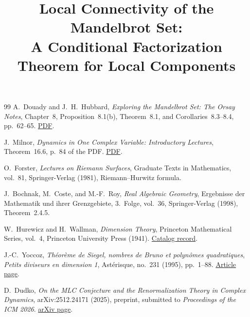 \documentclass[11pt,a4paper]{report}
\title{Local Connectivity of the Mandelbrot Set:\\
A Conditional Factorization Theorem for Local Components}
\author{}
\date{}
\begin{document}
\maketitle
\tableofcontents
\clearpage








\renewcommand{\bibname}{References}
\begin{thebibliography}{99}\small
{}
A.~Douady and J.~H.~Hubbard,
\foreignlanguage{english}{\emph{Exploring the Mandelbrot Set: The Orsay Notes}},
Chapter~8, Proposition~8.1(b), Theorem~8.1, and Corollaries~8.3--8.4,
pp.~62--65.
\href{https://pi.math.cornell.edu/~hubbard/OrsayEnglish.pdf}
{PDF}.

J.~Milnor,
\foreignlanguage{english}{\emph{Dynamics in One Complex Variable: Introductory Lectures}},
Theorem~16.6, p.~84 of the PDF.
\href{https://arxiv.org/pdf/math/9201272#page=84}
{PDF}.

O.~Forster,
\foreignlanguage{english}{\emph{Lectures on Riemann Surfaces}},
Graduate Texts in Mathematics, vol.~81, Springer-Verlag (1981),
Riemann--Hurwitz formula.

J.~Bochnak, M.~Coste, and M.-F.~Roy,
\foreignlanguage{english}{\emph{Real Algebraic Geometry}},
Ergebnisse der Mathematik und ihrer Grenzgebiete, 3.~Folge, vol.~36,
Springer-Verlag (1998), Theorem~2.4.5.

W.~Hurewicz and H.~Wallman,
\foreignlanguage{english}{\emph{Dimension Theory}},
Princeton Mathematical Series, vol.~4, Princeton University Press (1941).
\href{https://archive.org/details/dimensiontheory00hure}
{Catalog record}.

J.-C.~Yoccoz,
\foreignlanguage{english}{\emph{Théorème de Siegel, nombres de Bruno et
polynômes quadratiques}},
\foreignlanguage{english}{\emph{Petits diviseurs en dimension 1}},
Astérisque, no.~231 (1995), pp.~1--88.
\href{https://www.numdam.org/book-part/AST_1995__231__1_0/}
{Article page}.

D.~Dudko,
\foreignlanguage{english}{\emph{On the MLC Conjecture and the
Renormalization Theory in Complex Dynamics}},
arXiv:2512.24171 (2025), preprint, submitted to
\foreignlanguage{english}{\emph{Proceedings of the ICM 2026}}.
\href{https://arxiv.org/abs/2512.24171}{arXiv page}.


\end{thebibliography}
\end{document}
